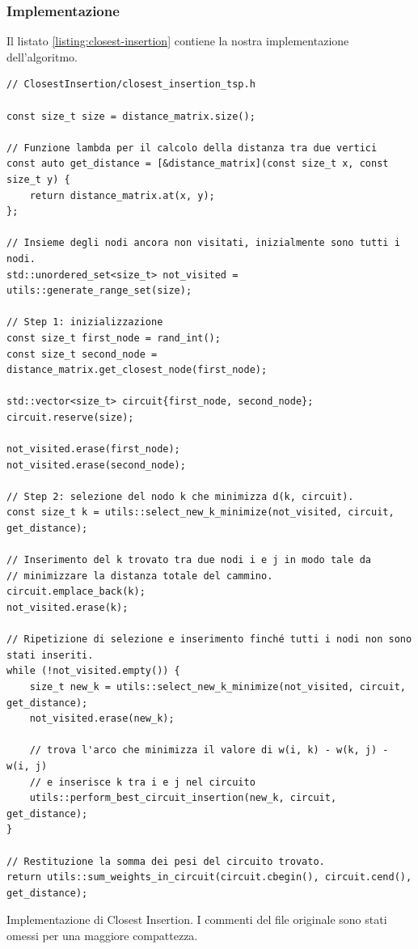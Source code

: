 \subsubsection{Implementazione}

\noindent Il listato \ref{listing:closest-insertion} contiene la
nostra implementazione dell'algoritmo.

\begin{listing}[!ht]
\begin{verbatim}
// ClosestInsertion/closest_insertion_tsp.h

const size_t size = distance_matrix.size();

// Funzione lambda per il calcolo della distanza tra due vertici
const auto get_distance = [&distance_matrix](const size_t x, const size_t y) {
    return distance_matrix.at(x, y);
};

// Insieme degli nodi ancora non visitati, inizialmente sono tutti i nodi.
std::unordered_set<size_t> not_visited = utils::generate_range_set(size);

// Step 1: inizializzazione
const size_t first_node = rand_int();
const size_t second_node = distance_matrix.get_closest_node(first_node);

std::vector<size_t> circuit{first_node, second_node};
circuit.reserve(size);

not_visited.erase(first_node);
not_visited.erase(second_node);

// Step 2: selezione del nodo k che minimizza d(k, circuit).
const size_t k = utils::select_new_k_minimize(not_visited, circuit, get_distance);

// Inserimento del k trovato tra due nodi i e j in modo tale da
// minimizzare la distanza totale del cammino.
circuit.emplace_back(k);
not_visited.erase(k);

// Ripetizione di selezione e inserimento finché tutti i nodi non sono stati inseriti.
while (!not_visited.empty()) {
    size_t new_k = utils::select_new_k_minimize(not_visited, circuit, get_distance);
    not_visited.erase(new_k);

    // trova l'arco che minimizza il valore di w(i, k) - w(k, j) - w(i, j)
    // e inserisce k tra i e j nel circuito
    utils::perform_best_circuit_insertion(new_k, circuit, get_distance);
}

// Restituzione la somma dei pesi del circuito trovato.
return utils::sum_weights_in_circuit(circuit.cbegin(), circuit.cend(), get_distance);
\end{verbatim}
\caption{Implementazione di Closest Insertion. I commenti del file originale sono stati omessi per una maggiore compattezza.}
\label{listing:closest-insertion}
\end{listing}

